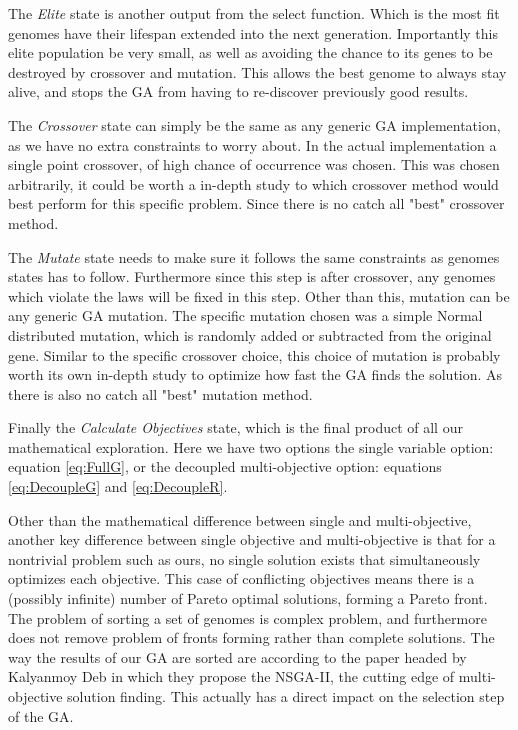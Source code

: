 \documentclass[11pt]{article}
\begin{document}
    The \textit{Elite} state is another output from the select function. Which is
    the most fit genomes have their lifespan extended into the next generation.
    Importantly this elite population be very small, as well as avoiding the
    chance to its genes to be destroyed by crossover and mutation. \cite{DeJong}
    This allows the best genome to always stay alive, and stops the GA from
    having to re-discover previously good results.

    The \textit{Crossover} state can simply be the same as any generic GA implementation,
    as we have no extra constraints to worry about. In the actual implementation
    a single point crossover, of high chance of occurrence was chosen. This was
    chosen arbitrarily, it could be worth a in-depth study to which crossover
    method would best perform for this specific problem. Since there is no catch all
    "best" crossover method.

    The \textit{Mutate} state needs to make sure it follows the same constraints as
    genomes states has to follow. Furthermore since this step is after crossover,
    any genomes which violate the laws will be fixed in this step. Other than this,
    mutation can be any generic GA mutation. The specific mutation chosen was a
    simple Normal distributed mutation, which is randomly added or subtracted from
    the original gene. Similar to the specific crossover choice, this choice
    of mutation is probably worth its own in-depth study to optimize how fast
    the GA finds the solution. As there is also no catch all "best" mutation method.

    Finally the \textit{Calculate Objectives} state, which is the final product of all our
    mathematical exploration. Here we have two options the single variable option: equation
    \ref{eq:FullG}, or the decoupled multi-objective option: equations \ref{eq:DecoupleG}
    and \ref{eq:DecoupleR}. 

    Other than the mathematical difference between single and multi-objective,
    another key difference between single objective and multi-objective is that for a
    nontrivial problem such as ours, no single solution exists that simultaneously
    optimizes each objective. This case of conflicting objectives means there is
    a (possibly infinite) number of Pareto optimal solutions, forming a Pareto front.
    The problem of sorting a set of genomes is complex problem, and furthermore
    does not remove problem of fronts forming rather than complete solutions.
    The way the results of our GA are sorted are according to the paper headed by
    Kalyanmoy Deb \cite{DebPratapAgarwalMeyarivan} in which they propose the
    NSGA-II, the cutting edge of multi-objective solution finding. This actually
    has a direct impact on the selection step of the GA.
\end{document}
